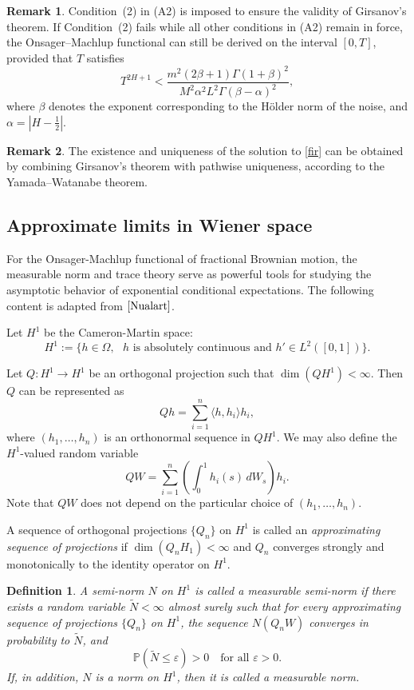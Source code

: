 \documentclass[preprint,12pt]{elsarticle}
\newtheorem{definition}[theorem]{Definition}
\theoremstyle{definition}  %
\newtheorem{remark}{Remark}
\theoremstyle{plain}  %
\begin{document}
\begin{remark}
Condition~(2) in (A2) is imposed to ensure the validity of Girsanov’s theorem. 
If Condition~(2) fails while all other conditions in (A2) remain in force, 
the Onsager--Machlup functional can still be derived on the interval $[0,T]$, 
provided that $T$ satisfies
\[
    T^{2H+1} 
    < 
    \frac{m^2 (2\beta+1)\Gamma(1+\beta)^2}
         {M^2 \alpha^2 L^2 \Gamma(\beta-\alpha)^2},
\]
where $\beta$ denotes the exponent corresponding to the H\"older norm of the noise, 
and $\alpha = |H - \tfrac{1}{2}|$.
\end{remark}

\begin{remark}
    The existence and uniqueness of the solution to \eqref{fir} can be obtained by combining Girsanov's theorem with pathwise uniqueness, according to the Yamada--Watanabe theorem.
\end{remark}

    \subsection{Approximate limits in Wiener space}
    For the Onsager-Machlup functional of fractional Brownian motion, 
the measurable norm and trace theory serve as powerful tools for studying 
the asymptotic behavior of exponential conditional expectations. 
The following content is adapted from $\cite{Nualart}$.

    
   
   
   Let $H^1$ be the Cameron-Martin space:
   \begin{equation*}
   	H^1:=\{h\in \Omega,\text{ $h$ is absolutely continuous and $h'$}\in L^2([0,1])\}.
   \end{equation*}

    Let $Q : H^1 \to H^1$ be an orthogonal projection such that 
$\dim(QH^1) < \infty$. Then $Q$ can be represented as
\[
Qh = \sum_{i=1}^n \langle h, h_i \rangle h_i,
\]
where $(h_1, \ldots, h_n)$ is an orthonormal sequence in $QH^1$. 
We may also define the $H^1$-valued random variable
\[
QW = \sum_{i=1}^n \left( \int_0^1 h_i(s)\, dW_s \right) h_i.
\]
Note that $QW$ does not depend on the particular choice of 
$(h_1, \ldots, h_n)$.

A sequence of orthogonal projections $\{Q_n\}$ on $H^1$ is called an 
\emph{approximating sequence of projections} if $\dim(Q_n H_1) < \infty$ 
and $Q_n$ converges strongly and monotonically to the identity operator on $H^1$.

\begin{definition}
A semi-norm $N$ on $H^1$ is called a \emph{measurable semi-norm} if there 
exists a random variable $\tilde{N} < \infty$ almost surely such that 
for every approximating sequence of projections $\{Q_n\}$ on $H^1$, 
the sequence $N(Q_n W)$ converges in probability to $\tilde{N}$, and
\[
\mathbb{P}(\tilde{N} \leq \varepsilon) > 0 
\quad \text{for all } \varepsilon > 0.
\]
If, in addition, $N$ is a norm on $H^1$, then it is called a 
\emph{measurable norm}.
\end{definition}
\end{document}
